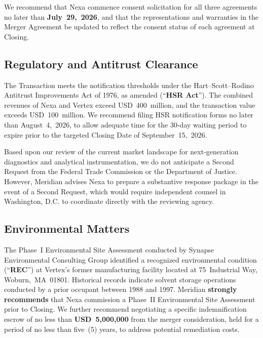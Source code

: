 \documentclass[11pt,a4paper]{scrartcl}
\begin{document}
We recommend that Nexa commence consent solicitation for all three agreements no later than
\textbf{July~29,~2026}, and that the representations and warranties in the Merger Agreement
be updated to reflect the consent status of each agreement at Closing.

\subsection{Regulatory and Antitrust Clearance}

The Transaction meets the notification thresholds under the Hart--Scott--Rodino Antitrust
Improvements Act of 1976, as amended (``\textbf{HSR Act}''). The combined revenues of Nexa
and Vertex exceed USD~400~million, and the transaction value exceeds USD~100~million. We
recommend filing HSR notification forms no later than August~4,~2026, to allow adequate time
for the 30-day waiting period to expire prior to the targeted Closing Date of September~15,~2026.

Based upon our review of the current market landscape for next-generation diagnostics and
analytical instrumentation, we do not anticipate a Second Request from the Federal Trade
Commission or the Department of Justice. However, Meridian advises Nexa to prepare a
substantive response package in the event of a Second Request, which would require independent
counsel in Washington, D.C. to coordinate directly with the reviewing agency.

\subsection{Environmental Matters}

\begin{tcolorbox}[cautionbox, title={\faExclamationTriangle\enspace Environmental Risk~--- Phase II Evaluation Required}]
The Phase~I Environmental Site Assessment conducted by Synapse Environmental Consulting Group
identified a recognized environmental condition (``\textbf{REC}'') at Vertex's former
manufacturing facility located at 75~Industrial Way, Woburn,~MA~01801. Historical records
indicate solvent storage operations conducted by a prior occupant between 1988 and 1997.
Meridian \textbf{strongly recommends} that Nexa commission a Phase~II Environmental Site
Assessment prior to Closing. We further recommend negotiating a specific indemnification
escrow of no less than \textbf{USD~5,000,000} from the merger consideration, held for a
period of no less than five~(5) years, to address potential remediation costs.
\end{tcolorbox}
\end{document}
